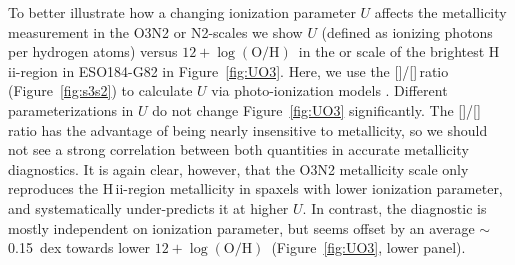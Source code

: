 \documentclass[traditabstract]{aa}
\newcommand{\hii}{\mbox{H\,{\sc ii}}}
\newcommand{\oh}{12+\log(\mathrm{O/H})}
\newcommand{\sii}{[\ion{S}{ii}]}
\newcommand{\siii}{[\ion{S}{iii}]}
\begin{document}
\begin{appendix}
To better illustrate how a changing ionization parameter $U$ affects the metallicity measurement in the O3N2 or N2-scales we show $U$ (defined as ionizing photons per hydrogen atoms) versus $\oh$\, in the \citet{2004MNRAS.348L..59P} or \citet{2016Ap&SS.361...61D} scale of the brightest \hii-region in ESO184-G82 in Figure~\ref{fig:UO3}. Here, we use the \sii/\siii\,ratio (Figure~\ref{fig:s3s2}) to calculate $U$ via photo-ionization models \citep{2011MNRAS.415.3616D}. Different parameterizations in $U$ \citep[e.g.][]{2016A&A...594A..37M} do not change Figure~\ref{fig:UO3} significantly. The \sii/\siii\,ratio has the advantage of being nearly insensitive to metallicity, so we should not see a strong correlation between both quantities in accurate metallicity diagnostics. It is again clear, however, that the O3N2 metallicity scale only reproduces the \hii-region metallicity in spaxels with lower ionization parameter, and systematically under-predicts it at higher $U$. In contrast, the \citet{2016Ap&SS.361...61D} diagnostic is mostly independent on ionization parameter, but seems offset by an average $\sim$0.15~dex towards lower $\oh$\, (Figure~\ref{fig:UO3}, lower panel).

\end{appendix}
\end{document}
